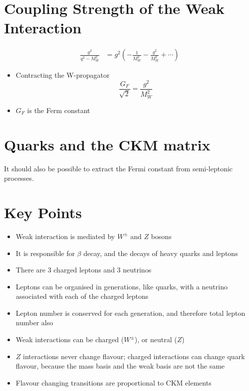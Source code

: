 \documentclass[a4paper, 11pt, normalem]{report}
\begin{document}
\section{Coupling Strength of the Weak Interaction}
\begin{align}
    \frac{g^2}{q^2-M_W^2} &= g^2\left(-\frac{1}{M_W^2} - \frac{g^2}{M_W^2} + \cdots\right)
\end{align}
\begin{itemize}
    \item Contracting the W-propagator
        \begin{equation}
            \frac{G_F}{\sqrt{2}} = \frac{g^2}{M_W^2}
        \end{equation}
    \item $G_F$ is the Ferm constant
\end{itemize}

\section{Quarks and the CKM matrix}
It should also be possible to extract the Fermi constant from semi-leptonic processes.

\section{Key Points}
\begin{itemize}
    \item Weak interaction is mediated by $W^\pm$ and $Z$ bosons
    \item It is responsible for $\beta$ decay, and the decays of heavy quarks and leptons
    \item There are 3 charged leptons and 3 neutrinos
    \item Leptons can be organised in generations, like quarks, with a neutrino associated with each of the charged leptons
    \item Lepton number is conserved for each generation, and therefore total lepton number also
    \item Weak interactions can be charged ($W^\pm$), or neutral ($Z$)
    \item $Z$ interactions never change flavour; charged interactions can change quark flavour, because the mass basis and the weak basis are not the same
    \item Flavour changing transitions are proportional to CKM elements
\end{itemize}
\end{document}
